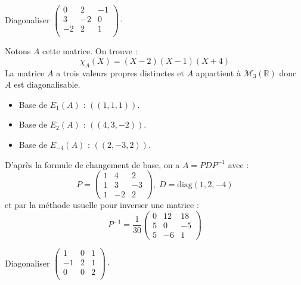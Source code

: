\documentclass[a4paper,10pt]{report}
\begin{document}
\begin{Exa} Diagonaliser $\begin{pmatrix}
0 & 2 & -1 \\
3 & -2 & 0 \\
-2 & 2 & 1 \\
\end{pmatrix}\cdot$
\end{Exa}

\corr Notons $A$ cette matrice. On trouve :
$$ \chi_A(X) = (X-2)(X-1)(X+4)$$
La matrice $A$ a trois valeurs propres distinctes et $A$ appartient à $\mathcal{M}_3(\mathbb{R})$ donc $A$ est diagonalisable.
\begin{itemize}
\item Base de $E_1(A)$ : $((1,1,1))$.
\item Base de $E_2(A)$ : $((4,3,-2))$.
\item Base de $E_{-4}(A)$ : $((2,-3,2))$.
\end{itemize}
D'après la formule de changement de base, on a $A = PDP^{-1}$ avec :
$$ P = \begin{pmatrix}
1 & 4 & 2 \\
1 & 3 & -3 \\
1 & -2 & 2
\end{pmatrix}, \; D=\textrm{diag}(1,2,-4)$$
et par la méthode usuelle pour inverser une matrice :
$$ P^{-1} = \dfrac{1}{30} \begin{pmatrix}
0 & 12 & 18 \\
5 & 0 & -5 \\
5 & -6 & 1 
\end{pmatrix}$$

\begin{Exa} Diagonaliser $\begin{pmatrix}
1 & 0& 1 \\
-1 & 2 & 1 \\
0 & 0 & 2 \\
\end{pmatrix}\cdot$
\end{Exa}
\end{document}
